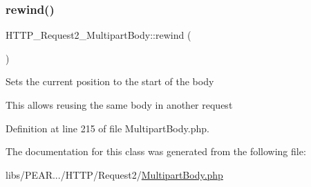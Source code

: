 \subsubsection{\texorpdfstring{rewind()}{rewind()}}
{\footnotesize\ttfamily H\+T\+T\+P\+\_\+\+Request2\+\_\+\+Multipart\+Body\+::rewind (\begin{DoxyParamCaption}{ }\end{DoxyParamCaption})}

Sets the current position to the start of the body

This allows reusing the same body in another request 

Definition at line 215 of file Multipart\+Body.\+php.



The documentation for this class was generated from the following file\+:\begin{DoxyCompactItemize}
\item 
libs/\+P\+E\+A\+R.../\+H\+T\+T\+P/\+Request2/\hyperlink{MultipartBody_8php}{Multipart\+Body.\+php}\end{DoxyCompactItemize}
